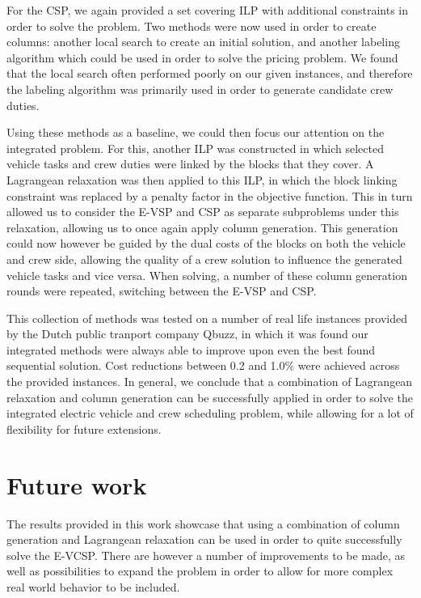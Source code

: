 \documentclass[]{article}
\begin{document}
For the CSP, we again provided a set covering ILP with additional constraints in order to solve the problem. Two methods were now used in order to create columns: another local search to create an initial solution, and another labeling algorithm which could be used in order to solve the pricing problem.  We found that the local search often performed poorly on our given instances, and therefore the labeling algorithm was primarily used in order to generate candidate crew duties. 

Using these methods as a baseline, we could then focus our attention on the integrated problem. For this, another ILP was constructed in which selected vehicle tasks and crew duties were linked by the blocks that they cover. A Lagrangean relaxation was then applied to this ILP, in which the block linking constraint was replaced by a penalty factor in the objective function. This in turn allowed us to consider the E-VSP and CSP as separate subproblems under this relaxation, allowing us to once again apply column generation. This generation could now however be guided by the dual costs of the blocks on both the vehicle and crew side, allowing the quality of a crew solution to influence the generated vehicle tasks and vice versa. When solving, a number of these column generation rounds were repeated, switching between the E-VSP and CSP. 

This collection of methods was tested on a number of real life instances provided by the Dutch public tranport company Qbuzz, in which it was found our integrated methods were always able to improve upon even the best found sequential solution. Cost reductions between 0.2 and 1.0\% were achieved across the provided instances. In general, we conclude that a combination of Lagrangean relaxation and column generation can be successfully applied in order to solve the integrated electric vehicle and crew scheduling problem, while allowing for a lot of flexibility for future extensions.

\section{Future work}
The results provided in this work showcase that using a combination of column generation and Lagrangean relaxation can be used in order to quite successfully solve the E-VCSP. There are however a number of improvements to be made, as well as possibilities to expand the problem in order to allow for more complex real world behavior to be included. 
\end{document}
